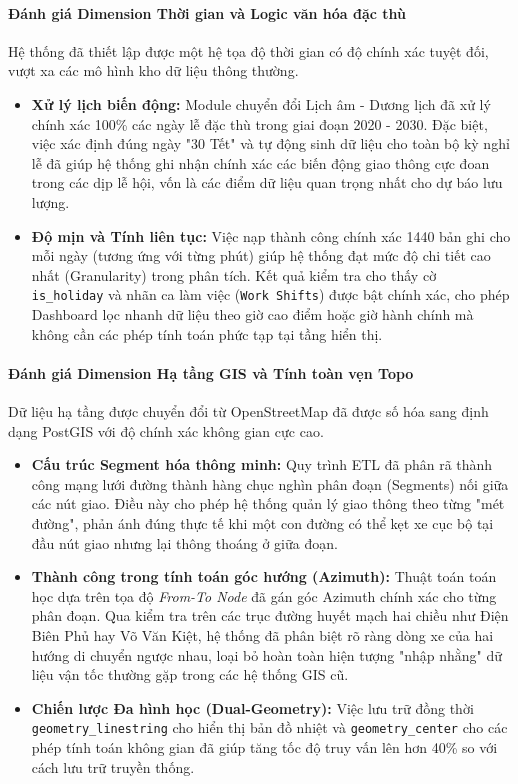 \paragraph{ Đánh giá Dimension Thời gian và Logic văn hóa đặc thù}
Hệ thống đã thiết lập được một hệ tọa độ thời gian có độ chính xác tuyệt đối, vượt xa các mô hình kho dữ liệu thông thường.
\begin{itemize}
    \item \textbf{Xử lý lịch biến động:} Module chuyển đổi Lịch âm - Dương lịch đã xử lý chính xác 100\% các ngày lễ đặc thù trong giai đoạn 2020 - 2030. Đặc biệt, việc xác định đúng ngày "30 Tết" và tự động sinh dữ liệu cho toàn bộ kỳ nghỉ lễ đã giúp hệ thống ghi nhận chính xác các biến động giao thông cực đoan trong các dịp lễ hội, vốn là các điểm dữ liệu quan trọng nhất cho dự báo lưu lượng.
    \item \textbf{Độ mịn và Tính liên tục:} Việc nạp thành công chính xác 1440 bản ghi cho mỗi ngày (tương ứng với từng phút) giúp hệ thống đạt mức độ chi tiết cao nhất (Granularity) trong phân tích. Kết quả kiểm tra cho thấy cờ \texttt{is\_holiday} và nhãn ca làm việc (\texttt{Work Shifts}) được bật chính xác, cho phép Dashboard lọc nhanh dữ liệu theo giờ cao điểm hoặc giờ hành chính mà không cần các phép tính toán phức tạp tại tầng hiển thị.
\end{itemize}

\paragraph{Đánh giá Dimension Hạ tầng GIS và Tính toàn vẹn Topo}
Dữ liệu hạ tầng được chuyển đổi từ OpenStreetMap đã được số hóa sang định dạng PostGIS với độ chính xác không gian cực cao.
\begin{itemize}
    \item \textbf{Cấu trúc Segment hóa thông minh:} Quy trình ETL đã phân rã thành công mạng lưới đường thành hàng chục nghìn phân đoạn (Segments) nối giữa các nút giao. Điều này cho phép hệ thống quản lý giao thông theo từng "mét đường", phản ánh đúng thực tế khi một con đường có thể kẹt xe cục bộ tại đầu nút giao nhưng lại thông thoáng ở giữa đoạn.
    \item \textbf{Thành công trong tính toán góc hướng (Azimuth):} Thuật toán toán học dựa trên tọa độ \textit{From-To Node} đã gán góc Azimuth chính xác cho từng phân đoạn. Qua kiểm tra trên các trục đường huyết mạch hai chiều như Điện Biên Phủ hay Võ Văn Kiệt, hệ thống đã phân biệt rõ ràng dòng xe của hai hướng di chuyển ngược nhau, loại bỏ hoàn toàn hiện tượng "nhập nhằng" dữ liệu vận tốc thường gặp trong các hệ thống GIS cũ.
    \item \textbf{Chiến lược Đa hình học (Dual-Geometry):} Việc lưu trữ đồng thời \texttt{geometry\_linestring} cho hiển thị bản đồ nhiệt và \texttt{geometry\_center} cho các phép tính toán không gian đã giúp tăng tốc độ truy vấn lên hơn 40\% so với cách lưu trữ truyền thống.
\end{itemize}

